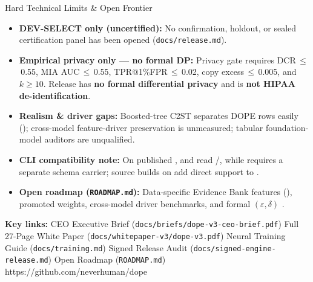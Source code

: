 \documentclass[8.5pt,letterpaper]{article}
\begin{document}
\begin{minipage}[t]{0.486\textwidth}
  \vspace{2.5pt}
  \begin{govbox}{Hard Technical Limits \& Open Frontier}
    \begin{itemize}[leftmargin=1.1em,itemsep=1.7pt,topsep=1.5pt]
      \item \textbf{DEV-SELECT only (uncertified):} No confirmation, holdout, or sealed certification panel has been opened (\texttt{docs/release.md}).
      \item \textbf{Empirical privacy only --- no formal DP:} Privacy gate requires DCR\,$\le$\,0.55, MIA AUC\,$\le$\,0.55, TPR@1\%FPR\,$\le$\,0.02, copy excess\,$\le$\,0.005, and $k\ge 10$. Release  has \textbf{no formal differential privacy} and is \textbf{not HIPAA de-identification}.
      \item \textbf{Realism \& driver gaps:} Boosted-tree C2ST separates DOPE rows easily (); cross-model feature-driver preservation is unmeasured; tabular foundation-model auditors are unqualified.
      \item \textbf{CLI compatibility note:} On published ,  and  read /, while  requires a separate  schema carrier; source builds on  add direct  support to .
      \item \textbf{Open roadmap (\texttt{ROADMAP.md}):} Data-specific Evidence Bank features (), promoted  weights, cross-model driver benchmarks, and formal $(\varepsilon,\delta)$ .
    \end{itemize}
  \end{govbox}
\end{minipage}

%
  {\textbf{Key links:} CEO Executive Brief (\texttt{docs/briefs/dope-v3-ceo-brief.pdf}) \;\textbar\; Full 27-Page White Paper (\texttt{docs/whitepaper-v3/dope-v3.pdf}) \;\textbar\; Neural Training Guide (\texttt{docs/training.md}) \;\textbar\; Signed Release Audit (\texttt{docs/signed-engine-release.md}) \;\textbar\; Open Roadmap (\texttt{ROADMAP.md})}%
  {https://github.com/neverhuman/dope}
\end{document}
